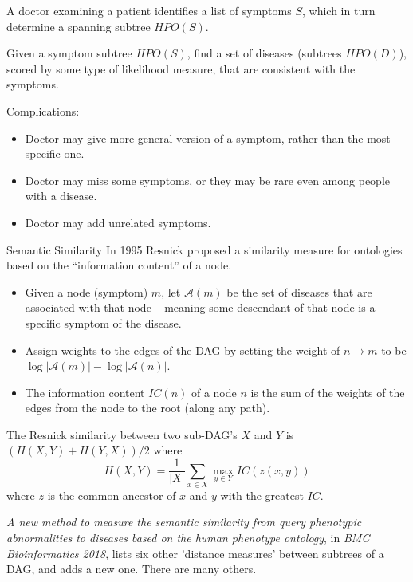 \documentclass{beamer}
\begin{document}
\begin{frame}
A doctor examining a patient identifies a list of symptoms $S$, which in turn determine a spanning subtree
$HPO(S)$.

\begin{problem} Given a symptom subtree $HPO(S)$, find a set of diseases (subtrees $HPO(D)$), scored by some type of likelihood measure, that are consistent with the symptoms.
\end{problem}

Complications:
\begin{itemize}
\item Doctor may give more general version of a symptom, rather than the most specific one.
\item Doctor may miss some symptoms, or they may be rare even among people with a disease.
\item Doctor may add unrelated symptoms.
\end{itemize}
\end{frame}
\begin{frame}{Semantic Similarity}
  In 1995 Resnick proposed a similarity measure for ontologies based on the ``information content'' of a node.
  \begin{itemize}
  \item Given a node (symptom) $m$, let $\mathcal{A}(m)$ be the set of diseases that are associated with that node -- meaning some descendant of that node is a specific symptom of the disease.
  \item Assign weights to the edges of the DAG by setting the weight of $n\to m$ to be $\log |\mathcal{A}(m)|-\log |\mathcal{A}(n)|$.
  \item The information content $IC(n)$  of a node $n$ is the sum of the weights of the edges from the node to the root (along any path).
  \end{itemize}

  \end{frame}
\begin{frame}
\begin{block}{}
  The Resnick similarity between two sub-DAG's $X$ and $Y$ is $(H(X,Y)+H(Y,X))/2$
  where
  $$
  H(X,Y)=\frac{1}{|X|}\sum_{x\in X} \max_{y\in Y} IC(z(x,y))
  $$
  where $z$ is the common ancestor of $x$ and $y$ with the greatest $IC$.
\end{block}
\begin{block}{}
  \textit{A new method to measure the semantic similarity from query phenotypic abnormalities to diseases based on the human phenotype ontology}, in \textit{BMC Bioinformatics 2018}, lists six other
  'distance measures' between subtrees of a DAG, and adds a new one.
  There are many others.
\end{block}
\end{frame}
\end{document}
